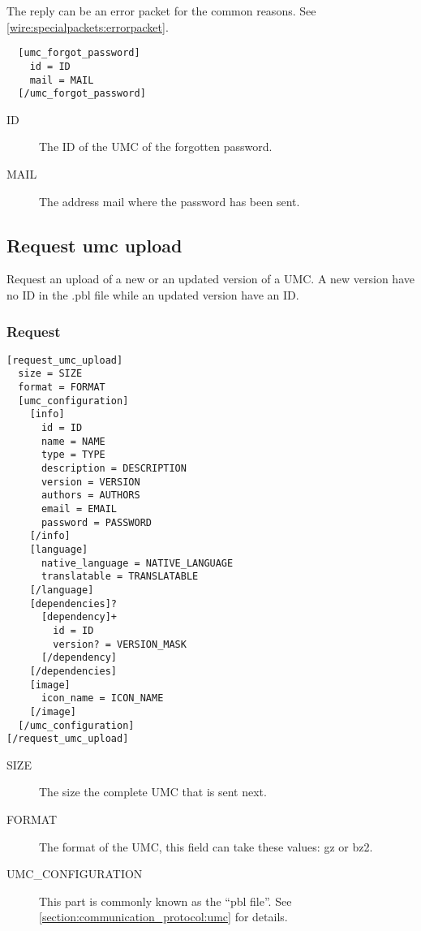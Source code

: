 The reply can be an error packet for the common reasons. See \cref{wire:specialpackets:errorpacket}.

\begin{lstlisting}
  [umc_forgot_password]
    id = ID
    mail = MAIL
  [/umc_forgot_password]
\end{lstlisting}
\begin{description}
  \item [ID] The ID of the UMC of the forgotten password.
  \item [MAIL] The address mail where the password has been sent.
\end{description}

\subsection{Request umc upload}
\label{wire:request_umc_upload}

Request an upload of a new or an updated version of a UMC.
A new version have no ID in the .pbl file while an updated version have an ID.

\subsubsection{Request}
\begin{lstlisting}
[request_umc_upload] 
  size = SIZE
  format = FORMAT
  [umc_configuration]
    [info]
      id = ID
      name = NAME
      type = TYPE
      description = DESCRIPTION
      version = VERSION
      authors = AUTHORS
      email = EMAIL
      password = PASSWORD
    [/info]
    [language]
      native_language = NATIVE_LANGUAGE
      translatable = TRANSLATABLE
    [/language]
    [dependencies]?
      [dependency]+
        id = ID
        version? = VERSION_MASK
      [/dependency]
    [/dependencies]
    [image]
      icon_name = ICON_NAME
    [/image]
  [/umc_configuration]
[/request_umc_upload]
\end{lstlisting}
\begin{description}
  \item [SIZE] The size the complete UMC that is sent next.
  \item [FORMAT] The format of the UMC, this field can take these values: gz or bz2.
  \item [UMC\_CONFIGURATION] This part is commonly known as the ``pbl file''. See \cref{section:communication_protocol:umc} for details.
\end{description}

